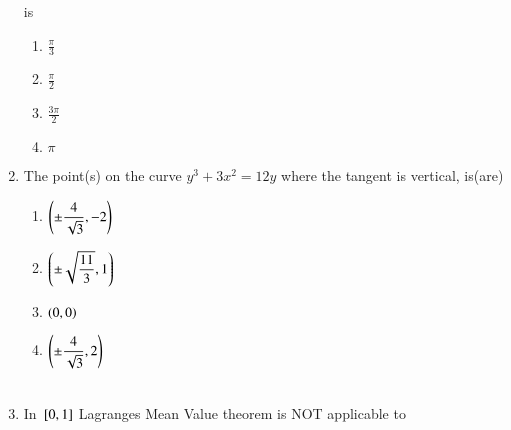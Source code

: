 \documentclass[journal]{IEEEtran}
\begin{document}
\begin{enumerate}[start=9]
is \hfill {}
\begin{multicols}{2}
\begin{enumerate}
    \item $\displaystyle\frac{\pi}{3}$\\
    \item $\displaystyle\frac{\pi}{2}$\\
    \item $\displaystyle\frac{3\pi}{2}$\\
    \item $\pi$
\end{enumerate}
\end{multicols}
\item The point(s) on the curve $y^3+3x^2=12y$ where the tangent is vertical, is(are)
\hfill {}\\
\begin{multicols}{2}
\begin{enumerate}
    \item $\left(\pm \displaystyle\frac{4}{\sqrt{3}},-2\right)$\\
    \item $\left(\pm\sqrt{\displaystyle\frac{11}{3}},1\right)$\\
    \item $\left(0,0\right)$\\
    \item $\left(\pm \displaystyle\frac{4}{\sqrt{3}},2\right)$\\\\
\end{enumerate}
\end{multicols}
\item In ${}\left[0,1\right]$ Lagranges Mean Value theorem is NOT applicable to
\hfill {}


\end{enumerate}
\end{document}
